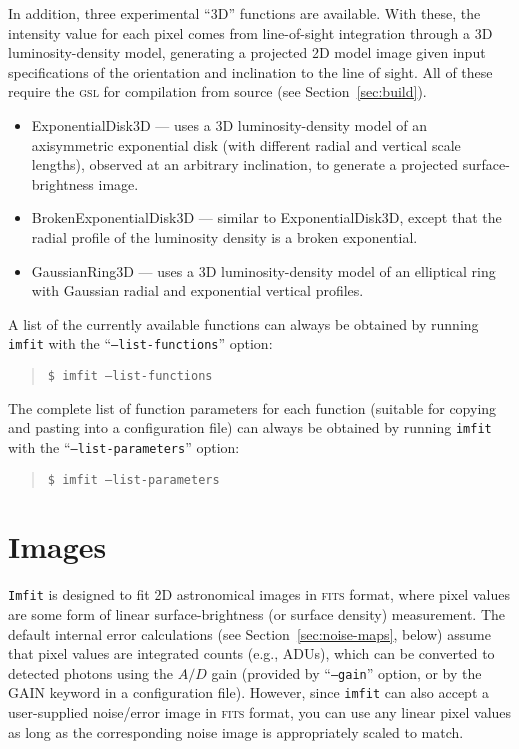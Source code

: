 \documentclass[10pt,a4paper,article]{memoir}
\newcommand{\imfit}{\texttt{imfit}}
\newcommand{\Imfit}{\texttt{Imfit}}
\begin{document}
In addition, three experimental ``3D'' functions are available. With these, the
intensity value for each pixel comes from line-of-sight
integration through a 3D luminosity-density model, generating a projected 2D
model image given input specifications of the orientation and inclination
to the line of sight. All of these require the \textsc{gsl} for compilation from source (see Section~\ref{sec:build}).
\begin{itemize}
\item ExponentialDisk3D --- uses a 3D luminosity-density model of an axisymmetric 
exponential disk (with different radial and vertical scale lengths), observed
at an arbitrary inclination, to generate a projected surface-brightness image.
\item BrokenExponentialDisk3D --- similar to ExponentialDisk3D, except that the
radial profile of the luminosity density is a broken exponential.
\item GaussianRing3D --- uses a 3D 
luminosity-density model of an elliptical ring with Gaussian radial and exponential 
vertical profiles.

\end{itemize}

A list of the currently available functions can always be obtained
by running \imfit{} with the ``\texttt{--list-functions}'' option:
\begin{quote}
  \texttt{\$ \imfit{} --list-functions}
\end{quote}
The complete list of function parameters for each function (suitable for copying
and pasting into a configuration file) can always be
obtained by running \imfit{} with the ``\texttt{--list-parameters}'' option:
\begin{quote}
  \texttt{\$ \imfit{} --list-parameters}
\end{quote}




\chapter{Images}

\Imfit{} is designed to fit 2D astronomical images in \textsc{fits} format, where
pixel values are some form of linear surface-brightness (or surface
density) measurement. The default internal error calculations (see
Section~\ref{sec:noise-maps}, below) assume that pixel values are
integrated counts (e.g., ADUs), which can be converted to detected
photons using the $A/D$ gain (provided by ``\texttt{--gain}'' option, or
by the GAIN keyword in a configuration file). However, since \imfit{} can
also accept a user-supplied noise/error image in \textsc{fits} format, you can
use any linear pixel values as long as the corresponding noise image is
appropriately scaled to match.
\end{document}

